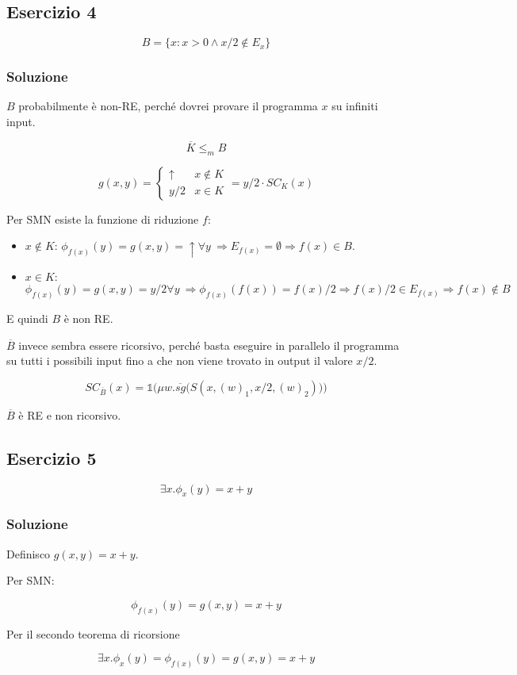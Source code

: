 \subsection{Esercizio 4}

$$
B = \{ x : x > 0 \wedge x/2 \notin E_x \}
$$

\subsubsection{Soluzione}

$B$ probabilmente è non-RE, perché dovrei provare il programma $x$ su infiniti input.

$$\overline{K} \leq_m B$$

$$
g(x,y) = \begin{cases}
\uparrow & x \notin K \\
y/2 & x \in K
\end{cases} = y/2 \cdot SC_K(x)
$$

Per SMN esiste la funzione di riduzione $f$:

\begin{itemize}
	\item $x \notin K$: $\phi_{f(x)}(y) = g(x,y) = \uparrow \forall y \:\Rightarrow E_{f(x)} = \emptyset \Rightarrow f(x) \in B$.
	\item $x \in K$: $\phi_{f(x)}(y) = g(x,y) = y/2 \forall y \: \Rightarrow \phi_{f(x)}(f(x)) = f(x)/2 \Rightarrow f(x)/2 \in E_{f(x)}  \Rightarrow f(x) \notin B $
\end{itemize}

E quindi $B$ è non RE.

$\overline{B}$ invece sembra essere ricorsivo, perché basta eseguire in parallelo il programma su tutti i possibili input fino a che non viene trovato in output il valore $x/2$.

$$
SC_{\overline{B}}(x) =\mathbb{1} \Bigg( \mu w. \overline{sg} \bigg(S(x,(w)_1, x/2, (w)_2 ) \bigg) \Bigg)
$$

$\overline{B}$ è RE e non ricorsivo.

\subsection{Esercizio 5}

$$\exists x . \phi_x(y) = x+y$$


\subsubsection{Soluzione}

Definisco $g(x,y) = x+y$.

Per SMN:

$$
\phi_{f(x)}(y) = g(x,y) = x+y
$$

Per il secondo teorema di ricorsione

$$
\exists x . \phi_x(y) = \phi_{f(x)}(y) = g(x,y) = x +y
$$